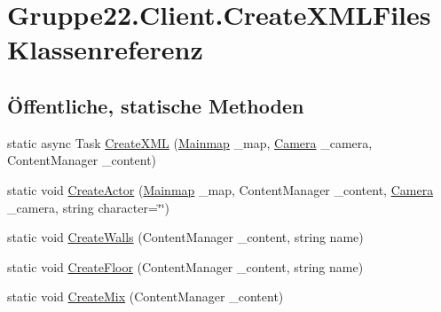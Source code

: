 \hypertarget{class_gruppe22_1_1_client_1_1_create_x_m_l_files}{\section{Gruppe22.\-Client.\-Create\-X\-M\-L\-Files Klassenreferenz}
\label{class_gruppe22_1_1_client_1_1_create_x_m_l_files}
}
\subsection*{Öffentliche, statische Methoden}
\begin{DoxyCompactItemize}
\item 
static async Task \hyperlink{class_gruppe22_1_1_client_1_1_create_x_m_l_files_af39075e03392991cba8d00d0724b840e}{Create\-X\-M\-L} (\hyperlink{class_gruppe22_1_1_client_1_1_mainmap}{Mainmap} \-\_\-map, \hyperlink{class_gruppe22_1_1_client_1_1_camera}{Camera} \-\_\-camera, Content\-Manager \-\_\-content)
\item 
static void \hyperlink{class_gruppe22_1_1_client_1_1_create_x_m_l_files_a27cc4bd6249a50b449ec4a365b23a773}{Create\-Actor} (\hyperlink{class_gruppe22_1_1_client_1_1_mainmap}{Mainmap} \-\_\-map, Content\-Manager \-\_\-content, \hyperlink{class_gruppe22_1_1_client_1_1_camera}{Camera} \-\_\-camera, string character=\char`\"{}\char`\"{})
\item 
static void \hyperlink{class_gruppe22_1_1_client_1_1_create_x_m_l_files_a58457d31a59c1e2caf9ecb5c8b722f52}{Create\-Walls} (Content\-Manager \-\_\-content, string name)
\item 
static void \hyperlink{class_gruppe22_1_1_client_1_1_create_x_m_l_files_ac83bee8eae267e40e976d6d665b0beb2}{Create\-Floor} (Content\-Manager \-\_\-content, string name)
\item 
static void \hyperlink{class_gruppe22_1_1_client_1_1_create_x_m_l_files_a9de979b9106c7528fdd849dcc59b0625}{Create\-Mix} (Content\-Manager \-\_\-content)
\end{DoxyCompactItemize}



